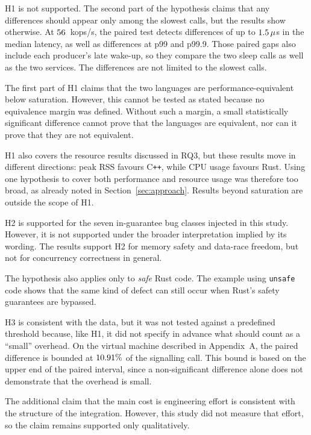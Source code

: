\documentclass[english,oneside,a4paper,censored,csm,software-track-2020]{HYthesisML}
\begin{document}
\begin{description}[style=sameline, leftmargin=2.4em, labelwidth=1.6em,
  labelsep=0.5em, font=\bfseries, listparindent=0pt, parsep=0.5ex]
  \item[H1] H1 is not supported. The second part of the hypothesis claims that any
        differences should appear only among the slowest calls, but the results show
        otherwise. At $56$~kops/s, the paired test detects differences of up to
        $1.5\,\mu$s in the median latency, as well as differences at p99
        and p99.9. Those paired gaps also include each producer's late wake-up, so they
        compare the two sleep calls as well as the two services. The differences are
        not limited to the slowest calls.

        The first part of H1 claims that the two languages are performance-equivalent
        below saturation. However, this cannot be tested as stated because no
        equivalence margin was defined. Without such a margin, a small statistically
        significant difference cannot prove that the languages are equivalent, nor can
        it prove that they are not equivalent.

        H1 also covers the resource results discussed in RQ3, but these results move
        in different directions: peak RSS favours C\texttt{++}, while CPU usage favours
        Rust. Using one hypothesis to cover both performance and resource usage was
        therefore too broad, as already noted in Section~\ref{sec:approach}. Results
        beyond saturation are outside the scope of H1.
  \item[H2] H2 is supported for the seven in-guarantee bug classes injected in this study.
        However, it is not supported under the broader interpretation implied by its
        wording. The results support H2 for memory safety and data-race freedom, but
        not for concurrency correctness in general.
        
        The hypothesis also applies only to \emph{safe} Rust code. The example using
        \texttt{unsafe} code shows that the same kind of defect can still occur when
        Rust's safety guarantees are bypassed.
  \item[H3] H3 is consistent with the data, but it was not tested against a predefined
        threshold because, like H1, it did not specify in advance what should count as
        a ``small'' overhead. On the virtual machine described in Appendix~A, the paired
        difference is bounded at $10.91\%$ of the signalling call. This bound is based on
        the upper end of the paired interval, since a non-significant difference alone
        does not demonstrate that the overhead is small.
        
        The additional claim that the main cost is engineering effort is consistent with
        the structure of the integration. However, this study did not measure that effort,
        so the claim remains supported only qualitatively.
\end{description}
\end{document}

